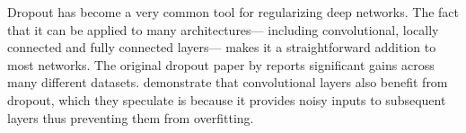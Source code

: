 Dropout has become a very common tool for regularizing deep networks.
The fact that it can be applied to many architectures---
including convolutional, locally connected and fully connected layers---%
makes it a straightforward addition to most networks.
The original dropout paper by \textcite{Hinton2012}
reports significant gains across many different datasets.
\textcite{Srivastava2014} demonstrate that convolutional layers
also benefit from dropout,
which they speculate is because it provides noisy inputs to subsequent layers
thus preventing them from overfitting.







